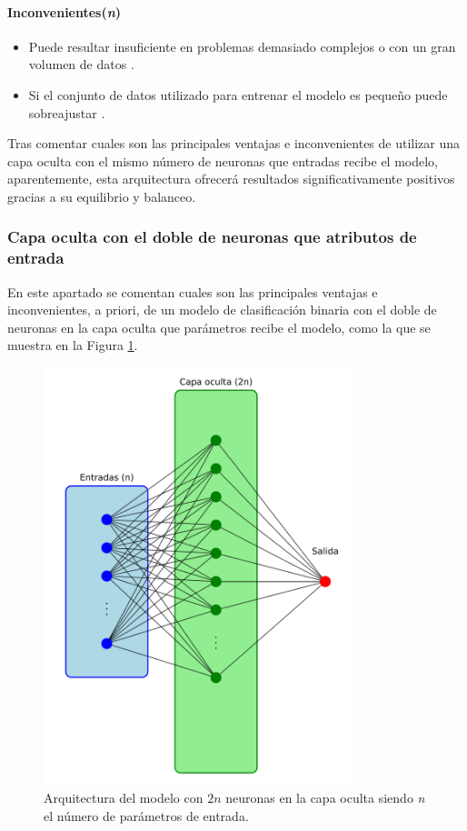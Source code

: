 \paragraph{Inconvenientes(\textit{n})}
\begin{itemize}
	\item Puede resultar insuficiente en problemas demasiado complejos o con un gran volumen de datos \cite{hochreiter1997long}.
	\item Si el conjunto de datos utilizado para entrenar el modelo es pequeño puede sobreajustar \cite{yamada2018understanding}.
\end{itemize}

Tras comentar cuales son las principales ventajas e inconvenientes de utilizar una capa oculta con el mismo número de neuronas que entradas recibe el modelo, aparentemente, esta arquitectura ofrecerá resultados significativamente positivos gracias a su equilibrio y balanceo.

\subsubsection{Capa oculta con el doble de neuronas que atributos de entrada}\label{sec:VIBIN98}
En este apartado se comentan cuales son las principales ventajas e inconvenientes, a priori, de un modelo de clasificación binaria con el doble de neuronas en la capa oculta que parámetros recibe el modelo, como la que se muestra en la Figura \ref{fig:arqnnBIN}.

\begin{figure}[H]
    \centering
    \includegraphics[width=0.8\textwidth]{./img/modelo/arqnnBIN.pdf}
    \caption{Arquitectura del modelo con $2n$ neuronas en la capa oculta siendo \textit{n} el número de parámetros de entrada.}
    \label{fig:arqnnBIN}
\end{figure}

